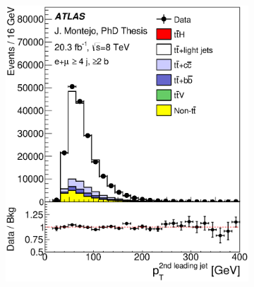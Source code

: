 \begin{figure}[tp!]
\begin{subfigure}{0.32\textwidth}
  \caption{} \end{subfigure}
  \\
  \begin{subfigure}{0.32\textwidth}
  \includegraphics[width=\textwidth]{Modeling/Figures/plots_4j2b/jet2_pt_ELEMUON_4jetin2btagin_NOMINAL.eps}
  \caption{} \end{subfigure}
  \begin{subfigure}{0.32\textwidth}

\end{subfigure}
\end{figure}
